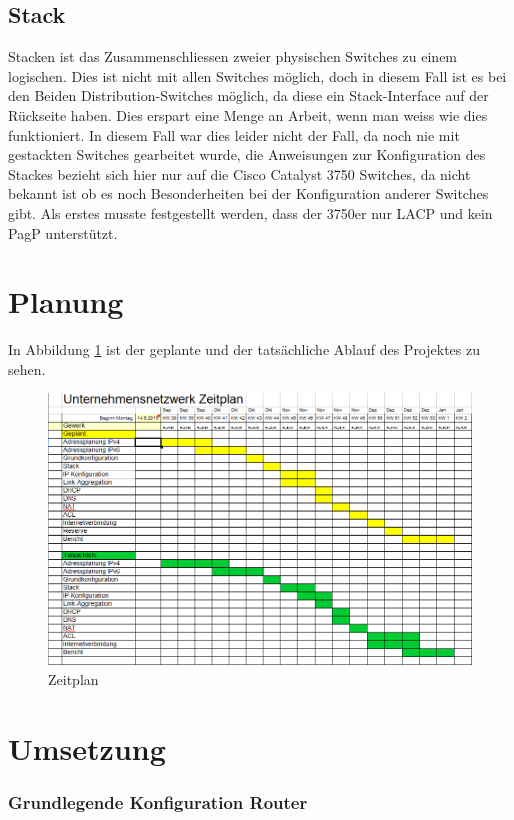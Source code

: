 \documentclass[12pt,a4paper,titlepage]{article}
\begin{document}
\subsection{Stack}
Stacken ist das Zusammenschliessen zweier physischen Switches zu einem logischen. Dies ist nicht mit allen Switches möglich, doch in diesem Fall ist es bei den Beiden Distribution-Switches möglich, da diese ein Stack-Interface auf der Rückseite haben. Dies erspart eine Menge an Arbeit, wenn man weiss wie dies funktioniert. In diesem Fall war dies leider nicht der Fall, da noch nie mit gestackten Switches gearbeitet wurde, die Anweisungen zur Konfiguration des Stackes bezieht sich hier nur auf die Cisco Catalyst 3750 Switches, da nicht bekannt ist ob es noch Besonderheiten bei der Konfiguration anderer Switches gibt. Als erstes musste festgestellt werden, dass der 3750er nur \acs{LACP} und kein \acs{PagP} unterstützt.


\newpage
\section{Planung}
In Abbildung \ref{abb:Zeitplan} ist der geplante und der tatsächliche Ablauf des Projektes zu sehen. 
\begin{figure}[H]
\begin{center}
\includegraphics[angle=90,scale=0.7]{Zeitplan.png}
\caption{Zeitplan}
\label{abb:Zeitplan}
\end{center}
\end{figure}
\section{Umsetzung}
\subsubsection{Grundlegende Konfiguration Router}
\end{document}
